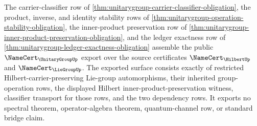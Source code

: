 \begin{theorem}
\label{thm:unitarygroup-public-namecert-export}
The carrier-classifier row of \autoref{thm:unitarygroup-carrier-classifier-obligation}, the product, inverse, and identity stability rows of \autoref{thm:unitarygroup-operation-stability-obligation}, the inner-product preservation row of \autoref{thm:unitarygroup-inner-product-preservation-obligation}, and the ledger exactness row of \autoref{thm:unitarygroup-ledger-exactness-obligation} assemble the public $\NameCert_{\UnitaryGroupUp}$ export over the source certificates $\NameCert_{\HilbertUp}$ and $\NameCert_{\LieGroupUp}$. The exported surface consists exactly of restricted Hilbert-carrier-preserving Lie-group automorphisms, their inherited group-operation rows, the displayed Hilbert inner-product-preservation witness, classifier transport for those rows, and the two dependency rows. It exports no spectral theorem, operator-algebra theorem, quantum-channel row, or standard bridge claim.
\end{theorem}
